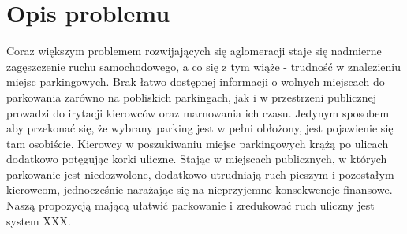 \newpage
\section{Opis problemu}

Coraz większym problemem rozwijających się aglomeracji staje się nadmierne zagęszczenie ruchu samochodowego, a co się z tym wiąże - trudność w znalezieniu miejsc parkingowych. Brak łatwo dostępnej informacji o wolnych miejscach do parkowania zarówno na pobliskich parkingach, jak i w przestrzeni publicznej prowadzi do irytacji kierowców oraz marnowania ich czasu. Jedynym sposobem aby przekonać się, że wybrany parking jest w pełni obłożony, jest pojawienie się tam osobiście. Kierowcy w poszukiwaniu miejsc parkingowych krążą po ulicach dodatkowo potęgując korki uliczne. Stając w miejscach publicznych, w których parkowanie jest niedozwolone, dodatkowo utrudniają ruch pieszym i pozostałym kierowcom, jednocześnie narażając się na nieprzyjemne konsekwencje finansowe. Naszą propozycją mającą ułatwić parkowanie i zredukować ruch uliczny jest system XXX.